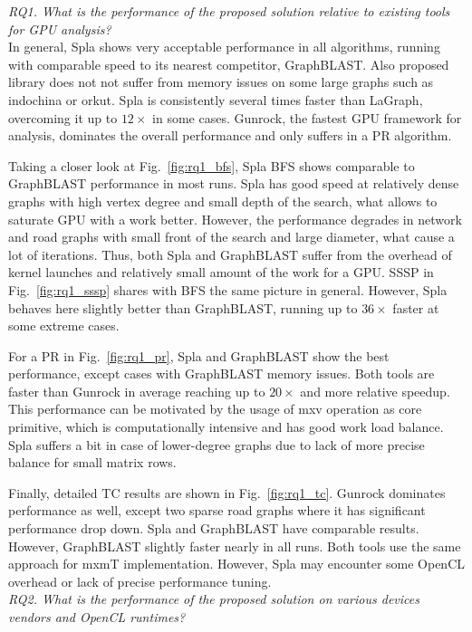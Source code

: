 \textit{RQ1. What is the performance of the proposed solution relative to existing tools for GPU analysis?}\\

In general, Spla shows very acceptable performance in all algorithms, running with comparable speed to its nearest competitor, GraphBLAST. Also proposed library does not not suffer from memory issues on some large graphs such as indochina or orkut. Spla is consistently several times faster than LaGraph, overcoming it up to $12\times$ in some cases. Gunrock, the fastest GPU framework for analysis, dominates the overall performance and only suffers in a PR algorithm.

Taking a closer look at Fig.~\ref{fig:rq1_bfs}, Spla BFS shows comparable to GraphBLAST performance in most runs. Spla has good speed at relatively dense graphs with high vertex degree and small depth of the search, what allows to saturate GPU with a work better. However, the performance degrades in network and road graphs with small front of the search and large diameter, what cause a lot of iterations. Thus, both Spla and GraphBLAST suffer from the overhead of kernel launches and relatively small amount of the work for a GPU. SSSP in Fig.~\ref{fig:rq1_sssp} shares with BFS the same picture in general. However, Spla behaves here slightly better than GraphBLAST, running up to $36\times$ faster at some extreme cases.

For a PR in Fig.~\ref{fig:rq1_pr}, Spla and GraphBLAST show the best performance, except cases with GraphBLAST memory issues. Both tools are faster than Gunrock in average reaching up to $20\times$ and more relative speedup. This performance can be motivated by the usage of mxv operation as core primitive, which is computationally intensive and has good work load balance. Spla suffers a bit in case of lower-degree graphs due to lack of more precise balance for small matrix rows.

Finally, detailed TC results are shown in Fig.~\ref{fig:rq1_tc}. Gunrock dominates performance as well, except two sparse road graphs where it has significant performance drop down. Spla and GraphBLAST have comparable results. However, GraphBLAST slightly faster nearly in all runs. Both tools use the same approach for mxmT implementation. However, Spla may encounter some OpenCL overhead or lack of precise performance tuning.\\

\textit{RQ2. What is the performance of the proposed solution on various devices vendors and OpenCL runtimes?}\\

